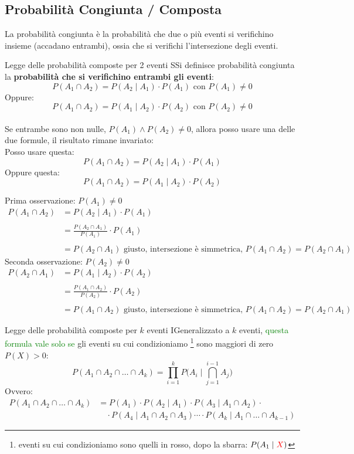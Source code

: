 \documentclass{article}  %
\theoremstyle{definition}
\begin{document}
\subsection{Probabilità Congiunta / Composta}
La probabilità congiunta è la probabilità che due o più eventi si verifichino insieme (accadano entrambi), ossia che si verifichi l'intersezione
degli eventi.
\begin{theorem}{Legge delle probabilità composte per 2 eventi}
	SSi definisce probabilità congiunta la \textbf{probabilità che si verifichino entrambi gli eventi}:
	\[
		P(A_1 \cap A_2)=P(A_2 \mid A_1)\cdot P(A_1) \text{ con } P(A_1) \neq 0
	\]
	Oppure:
	\[
		P(A_1 \cap A_2)=P(A_1 \mid A_2)\cdot P(A_2) \text{ con } P(A_2) \neq 0
	\]
	\\
	Se entrambe sono non nulle, $P(A_1)\land P(A_2) \neq 0$, allora posso usare una delle due formule, il risultato rimane invariato: \\
	Posso usare questa:
	\[
		P(A_1 \cap A_2)=P(A_2 \mid A_1)\cdot P(A_1)
	\]
	Oppure questa:
	\[
		P(A_1 \cap A_2)=P(A_1 \mid A_2)\cdot P(A_2)
	\]
\end{theorem}
Prima osservazione: $P(A_1) \neq 0$
\[
	\begin{aligned}
		P(A_1 \cap A_2)
		 & = P(A_2 \mid A_1)\cdot P(A_1)                                                                 \\ \\
		 & = \frac{P(A_2 \cap A_1)}{P(A_1)} \cdot P(A_1)                                                 \\ \\
		 & = P(A_2 \cap A_1) \text{ giusto, intersezione è simmetrica, } P(A_1 \cap A_2)=P(A_2 \cap A_1)
	\end{aligned}
\]
Seconda osservazione: $P(A_2) \neq 0$
\[
	\begin{aligned}
		P(A_2 \cap A_1)
		 & = P(A_1 \mid A_2)\cdot P(A_2)                                                                 \\ \\
		 & = \frac{P(A_1 \cap A_2)}{P(A_2)} \cdot P(A_2)                                                 \\ \\
		 & = P(A_1 \cap A_2) \text{ giusto, intersezione è simmetrica, } P(A_1 \cap A_2)=P(A_2 \cap A_1)
	\end{aligned}
\]
\begin{theorem}{Legge delle probabilità composte per $k$ eventi}
	IGeneralizzato a $k$ eventi, \textcolor{green}{questa formula vale solo se} gli eventi su cui condizioniamo
	\footnote{eventi su cui condizioniamo sono quelli in rosso, dopo la sbarra:
		$P(A_1 \mid \textcolor{red}{X})$} sono maggiori di zero $P(X)>0$:
	\[
		P(A_1 \cap A_2 \cap \dots \cap A_k)
		= \prod_{i=1}^{k} P\Big(A_i \;\big|\; \bigcap_{j=1}^{i-1} A_j\Big)
	\]
	Ovvero:
	\begin{align*}
		P(A_1 \cap A_2 \cap \dots \cap A_k)
		 & = P(A_1) \cdot P(A_2 \mid A_1) \cdot P(A_3 \mid A_1 \cap A_2) \cdot \\
		 & \quad \cdot P(A_4 \mid A_1 \cap A_2 \cap A_3) \cdots
		\cdot P(A_k \mid A_1 \cap \dots \cap A_{k-1})
	\end{align*}
\end{theorem}
\end{document}
